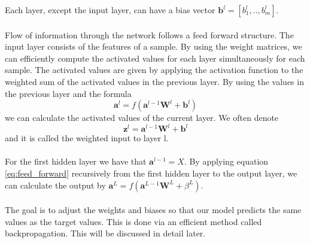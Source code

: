 Each layer, except the input layer, can have a bias vector $\boldsymbol{b}^l = [b_1^l, .., b_m^l]$.
\\
\\
Flow of information through the network follows a feed forward structure. The input layer consists of the features of a sample. By using the weight matrices, we can efficiently compute the activated values for each layer simultaneously for each sample. The activated values are given by applying the activation function to the weighted sum of the activated values in the previous layer. By using the values in the previous layer and the formula 
\begin{equation}
    \boldsymbol{a}^l =  f(\boldsymbol{a}^{l-1}\boldsymbol{W}^l + \boldsymbol{b}^l)
    \label{eq:feed_forward}
\end{equation}
we can calculate the activated values of the current layer. We often denote 
\begin{equation}
    \boldsymbol{z}^l =  \boldsymbol{a}^{l-1}\boldsymbol{W}^l + \boldsymbol{b}^l
\end{equation}
and it is called the weighted input to layer l. \\
\\
For the first hidden layer we have that $\boldsymbol{a}^{l-1} = X$. By applying equation \ref{eq:feed_forward} recursively from the first hidden layer to the output layer, we can calculate the output by $\boldsymbol{a}^L = f(\boldsymbol{a}^{L-1}\boldsymbol{W}^L + \beta^L)$.
\\
\\
The goal is to adjust the weights and biases so that our model predicts the same values as the target values. This is done via an efficient method called backpropagation. This will be discussed in detail later. 

